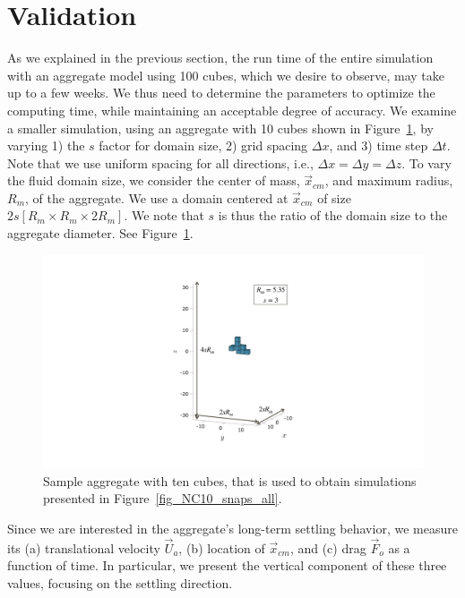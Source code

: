 \section{Validation}
\label{sec:ch3_validation}
As we explained in the previous section, the run time of the entire simulation with an aggregate model using 100 cubes, which we desire to observe, may take up to a few weeks. We thus need to determine the parameters to optimize the computing time, while maintaining an acceptable degree of accuracy. We examine a smaller simulation, using an aggregate with 10 cubes shown in Figure~\ref{fig_sample_agg10}, by varying 1) the $s$ factor for domain size, 2) grid spacing $\Delta x$, and 3) time step  $\Delta t$. Note that we use uniform spacing for all directions, i.e., $\Delta x = \Delta y = \Delta z$. To vary the fluid domain size, we consider the center of mass,  $\vec{x}_{cm}$, and maximum radius, $R_m$, of the aggregate.
We use a domain centered at $\vec{x}_{cm}$ of size  $2s\left[  R_m \times   R_m \times 2 R_m \right]$. We note that $s$ is thus the ratio of the domain size to the aggregate diameter. See Figure~\ref{fig_sample_agg10}.
\begin{figure}[ht]
	\begin{center}
		\includegraphics[scale=0.4]{./figures/fig_sample_agg10.pdf}
		\caption{Sample aggregate with ten cubes, that is used to obtain simulations presented in Figure~\ref{fig_NC10_snaps_all}. }
		\label{fig_sample_agg10}
	\end{center}
\end{figure}
\par
Since we are interested in the aggregate's long-term settling behavior, we measure its (a) translational velocity $\vec{U}_a$, (b) location of $\vec{x}_{cm}$, and (c) drag $\vec{F}_o$ as a function of time. 
In particular, we present the vertical component of these three values, focusing on the settling direction.
